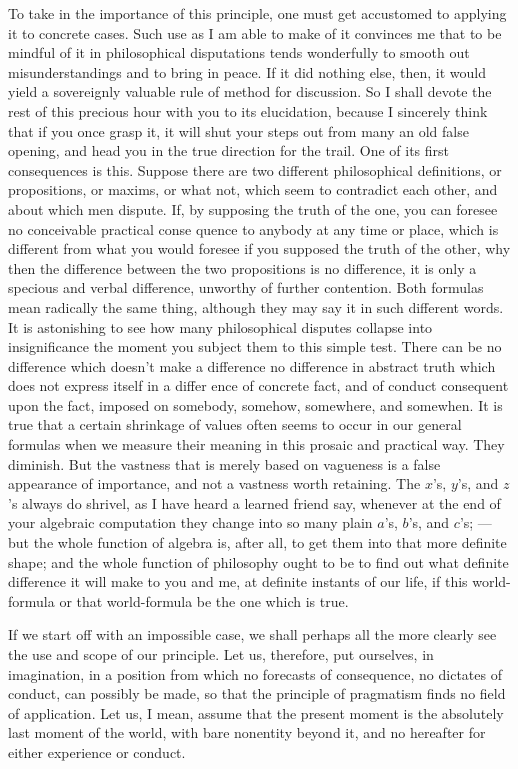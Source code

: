 \documentclass[]{article}
\begin{document}
To take in the importance of this principle, one must get accustomed to applying it to concrete cases. Such use as I am able to make of it convinces me that to be mindful of it in philosophical disputations tends wonderfully to smooth out misunderstandings and to bring in peace. If it did nothing else, then, it would yield a sovereignly valuable rule of method for discussion. So I shall devote the rest of this precious hour with you to its elucidation, because I sincerely think that if you once grasp it, it will shut your steps out from many an old false opening, and head you in the true direction for the trail. One of its first consequences is this. Suppose there are two different philosophical definitions, or propositions, or maxims, or what not, which seem to contradict each other, and about which men dispute. If, by supposing the truth of the one, you can foresee no conceivable practical conse quence to anybody at any time or place, which is different from what you would foresee if you supposed the truth of the other, why then the difference between the two propositions is no difference, it is only a specious and verbal difference, unworthy of further contention. Both formulas mean radically the same thing, although they may say it in such different words. It is astonishing to see how many philosophical disputes collapse into insignificance the moment you subject them to this simple test. There can be no difference which doesn't make a difference no difference in abstract truth which does not express itself in a differ ence of concrete fact, and of conduct consequent upon the fact, imposed on somebody, somehow, somewhere, and somewhen. It is true that a certain shrinkage of values often seems to occur in our general formulas when we measure their meaning in this prosaic and practical way. They diminish. But the vastness that is merely based on vagueness is a false appearance of importance, and not a vastness worth retaining. The $x$'s, $y$'s, and $z$'s always do shrivel, as I have heard a learned friend say, whenever at the end of your algebraic computation they change into so many plain $a$'s, $b$'s, and $c$'s; --- but the whole function of algebra is, after all, to get them into that more definite shape; and the whole function of philosophy ought to be to find out what definite difference it will make to you and me, at definite instants of our life, if this world-formula or that world-formula be the one which is true. 

If we start off with an impossible case, we shall perhaps all the more clearly see the use and scope of our principle. Let us, therefore, put ourselves, in imagination, in a position from which no forecasts of consequence, no dictates of conduct, can possibly be made, so that the principle of pragmatism finds no field of application. Let us, I mean, assume that the present moment is the absolutely last moment of the world, with bare nonentity beyond it, and no hereafter for either experience or conduct. 
\end{document}
